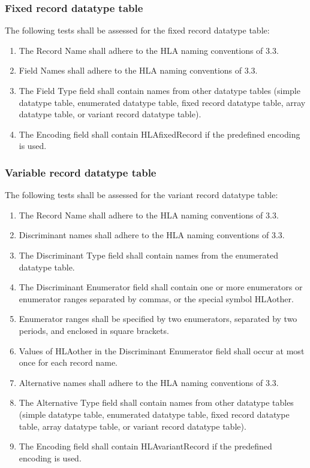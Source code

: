 \subsubsection{Fixed record datatype table}
The following tests shall be assessed for the fixed record datatype table:
\begin{enumerate}[label=\arabic*),leftmargin=42pt,labelsep=8pt,itemsep=1.2pt,topsep=2pt]
\item The Record Name shall adhere to the HLA naming conventions of 3.3.
\item Field Names shall adhere to the HLA naming conventions of 3.3.
\item The Field Type field shall contain names from other datatype tables (simple datatype table, enumerated datatype table, fixed record datatype table, array datatype table, or variant record datatype table).
\item The Encoding field shall contain HLAfixedRecord if the predefined encoding is used.
\end{enumerate}

\subsubsection{Variable record datatype table}
The following tests shall be assessed for the variant record datatype table:
\begin{enumerate}[label=\arabic*),leftmargin=42pt,labelsep=8pt,itemsep=1.2pt,topsep=2pt]
\item The Record Name shall adhere to the HLA naming conventions of 3.3.
\item Discriminant names shall adhere to the HLA naming conventions of 3.3.
\item The Discriminant Type field shall contain names from the enumerated datatype table.
\item The Discriminant Enumerator field shall contain one or more enumerators or enumerator ranges separated by commas, or the special symbol HLAother.
\item Enumerator ranges shall be specified by two enumerators, separated by two periods, and enclosed in square brackets.
\item Values of HLAother in the Discriminant Enumerator field shall occur at most once for each record name.
\item Alternative names shall adhere to the HLA naming conventions of 3.3.
\item The Alternative Type field shall contain names from other datatype tables (simple datatype table, enumerated datatype table, fixed record datatype table, array datatype table, or variant record datatype table).
\item The Encoding field shall contain HLAvariantRecord if the predefined encoding is used.
\end{enumerate}

